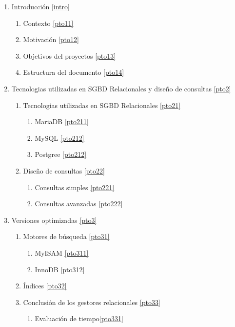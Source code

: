 \documentclass[12pt,a4paper]{article}
\begin{document}
\begin{enumerate}
\item Introducción \ref{intro}
	
	\begin{enumerate}[label*=\arabic*.]
	\item Contexto \ref{pto11}
	\item Motivación \ref{pto12}
	\item Objetivos del proyectos  \ref{pto13}
	\item Estructura del documento  \ref{pto14}
	\end{enumerate}

\item Tecnologias utilizadas en SGBD Relacionales y diseño de consultas \ref{pto2}
	\begin{enumerate}[label*=\arabic*.]
	\item Tecnologias utilizadas en SGBD Relacionales \ref{pto21}
		\begin{enumerate}[label*=\arabic*.]
		\item MariaDB \ref{pto211}
		\item MySQL \ref{pto212}
		\item Postgree \ref{pto212}
		\end{enumerate}
	\item Diseño de consultas \ref{pto22}
		\begin{enumerate}[label*=\arabic*.]
		\item Consultas simples \ref{pto221}
		\item Consultas avanzadas \ref{pto222}
		\end{enumerate}
	\end{enumerate}
	
	
\item Versiones optimizadas \ref{pto3}
	\begin{enumerate}[label*=\arabic*.]
	\item Motores de búsqueda \ref{pto31}
		\begin{enumerate}[label*=\arabic*.]
		\item MyISAM \ref{pto311}
		\item InnoDB \ref{pto312}
		\end{enumerate}
	\item Índices \ref{pto32}
	\item Conclusión de los gestores relacionales \ref{pto33}
		\begin{enumerate}[label*=\arabic*.]
		\item Evaluación de tiempo\ref{pto331}
		\end{enumerate}
	\end{enumerate}


\end{enumerate}
\end{document}
